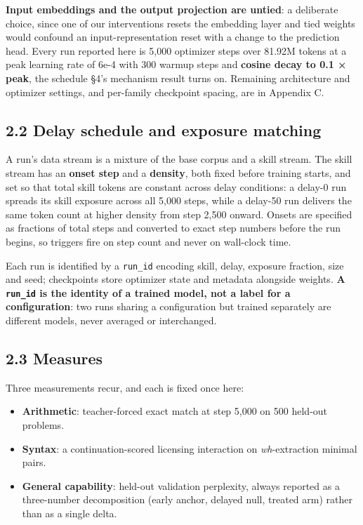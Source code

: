 \documentclass[11pt]{article}
\providecommand{\tightlist}{\setlength{\itemsep}{0pt}\setlength{\parskip}{0pt}}
\begin{document}
\textbf{Input embeddings and the output projection are untied}: a deliberate choice, since one of our interventions resets the embedding layer and tied weights would confound an input-representation reset with a change to the prediction head. Every run reported here is 5,000 optimizer steps over 81.92M tokens at a peak learning rate of 6e-4 with 300 warmup steps and \textbf{cosine decay to 0.1 × peak}, the schedule §4's mechanism result turns on. Remaining architecture and optimizer settings, and per-family checkpoint spacing, are in Appendix C.

\subsection{2.2 Delay schedule and exposure matching}\label{delay-schedule-and-exposure-matching}

A run's data stream is a mixture of the base corpus and a skill stream. The skill stream has
an \textbf{onset step} and a \textbf{density}, both fixed before training starts, and set so that total
skill tokens are constant across delay conditions: a delay-0 run spreads its skill exposure
across all 5,000 steps, while a delay-50 run delivers the same token count at higher density
from step 2,500 onward. Onsets are specified as fractions of total steps and converted to
exact step numbers before the run begins, so triggers fire on step count and never on
wall-clock time.

Each run is identified by a \texttt{run\_id} encoding skill, delay, exposure fraction, size and seed;
checkpoints store optimizer state and metadata alongside weights. \textbf{A \texttt{run\_id} is the
identity of a trained model, not a label for a configuration}: two runs sharing a
configuration but trained separately are different models, never averaged or interchanged.

\subsection{2.3 Measures}\label{measures}

Three measurements recur, and each is fixed once here:

\begin{itemize}
\tightlist
\item
  \textbf{Arithmetic}: teacher-forced exact match at step 5,000 on 500 held-out problems.
\item
  \textbf{Syntax}: a continuation-scored licensing interaction on \emph{wh}-extraction minimal pairs.
\item
  \textbf{General capability}: held-out validation perplexity, always reported as a three-number
  decomposition (early anchor, delayed null, treated arm) rather than as a single delta.
\end{itemize}
\end{document}
